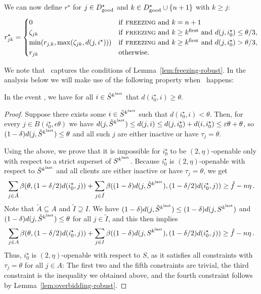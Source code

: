 We can now define $r^\star$ for $j \in D^\star_{\mathrm{good}}$ and $k \in D^\star_{\mathrm{good}} \cup \{n + 1\}$ with $k \geq j$:
\[
    r^\star_{jk} = 
    \begin{cases}
        0 & \text{if \textsc{freezing}\ and } k=n+1\\
       \zeta_{jk} & \text{if \textsc{freezing}\ and } k \geq k^{\mathrm{first}} \text{ and } d(j,i_0^\star) \leq \theta/3,\\
       \min(r_{j,k},\max(\zeta_{jk}, d(j, i^\star))) & \text{if \textsc{freezing}\ and } k \geq k^{\mathrm{first}} \text{ and } d(j,i_0^\star) > \theta/3,\\
        r_{jk} & \text{otherwise}.
    \end{cases}
\]

We note that \specialevent\ captures the conditions of Lemma~\ref{lem:freezing-robust}.
In the analysis below we will make use of the following property when \specialevent\ happens:

\begin{lemma}
\label{lem:superset-far}
In the event \specialevent, we have for all $i \in \tilde{S}^{k^{\mathrm{last}}}$ that $d(i_0^\star, i) \geq \theta$.
\end{lemma}
\begin{proof}
Suppose there exists some $i \in \tilde{S}^{k^{\mathrm{last}}}$ such that $d(i_0^\star, i) < \theta$.
Then, for every $j \in B(i_0^\star, \epsilon \theta)$ we have $d(j, \tilde{S}^{k^{\mathrm{last}}}) \leq d(j, i) \leq d(j, i_0^\star) + d(i, i_0^\star) \leq \varepsilon \theta + \theta$, so $(1-\delta) d(j, \tilde{S}^{k^{\mathrm{last}}}) \leq \theta$ and all such $j$ are either inactive or have $\tau_j = \theta$.

Using the above, we prove that it is impossible for $i_0^\star$ to be $(2,\eta)$-openable only with respect to a strict superset of $S^{k^{\mathrm{last}}}$.
Because $i_0^\star$ is $(2,\eta)$-openable with respect to $\tilde{S}^{k^{\mathrm{last}}}$ and all clients are either inactive or have $\tau_j=\theta$, we get
\[\sum_{j \in \tilde A} \beta(\theta, (1-\delta/2)d(i_0^\star,j)) + \sum_{j \in \tilde I} \beta((1-\delta)d(j,\tilde{S}^{k^{\mathrm{last}}}), (1-\delta/2)d(i_0^\star,j)) \geq \hat{f} - n \eta\,.\]
Note that $\tilde A \subseteq A$ and $\tilde I \supseteq I$.
We have $(1-\delta) d(j, \tilde S^{k^{\mathrm{last}}}) \leq (1-\delta) d(j, S^{k^{\mathrm{last}}})$ and $(1-\delta)d(j, \tilde{S}^{k^{\mathrm{last}}}) \leq \theta$ for all $j \in \tilde{I}$, and this then implies
\[\sum_{j \in A} \beta(\theta, (1-\delta/2)d(i_0^\star,j)) + \sum_{j \in I} \beta((1-\delta)d(j,S^{k^{\mathrm{last}}}), (1-\delta/2)d(i_0^\star,j)) \geq \hat{f} - n \eta\,.\]
Thus, $i_0^\star$ is $(2,\eta)$-openable with respect to $S$, as it satisfies all constraints with $\tau_j = \theta$ for all $j \in A$:
The first two and the fifth constraints are trivial, the third constraint is the inequality we obtained above, and the fourth constraint follows by Lemma~\ref{lem:overbidding-robust}.
\end{proof}

